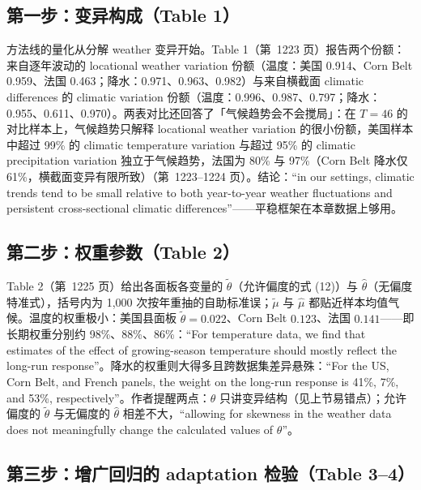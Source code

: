 \subsection{第一步：变异构成（Table 1）}

方法线的量化从分解 weather 变异开始。Table 1（第~1223 页）报告两个份额：来自逐年波动的 locational weather variation 份额（温度：美国 0.914、Corn Belt 0.959、法国 0.463；降水：0.971、0.963、0.982）与来自横截面 climatic differences 的 climatic variation 份额（温度：0.996、0.987、0.797；降水：0.955、0.611、0.970）。两表对比还回答了「气候趋势会不会搅局」：在 $T=46$ 的对比样本上，气候趋势只解释 locational weather variation 的很小份额，美国样本中超过 99\% 的 climatic temperature variation 与超过 95\% 的 climatic precipitation variation 独立于气候趋势，法国为 80\% 与 97\%（Corn Belt 降水仅 61\%，横截面变异有限所致）（第~1223--1224 页）。结论：``in our settings, climatic trends tend to be small relative to both year-to-year weather fluctuations and persistent cross-sectional climatic differences''\citep[第~1224 页]{merel2021climate}——平稳框架在本章数据上够用。

\subsection{第二步：权重参数（Table 2）}

Table 2（第~1225 页）给出各面板各变量的 $\widetilde{\theta}$（允许偏度的式 (12)）与 $\widehat{\theta}$（无偏度特准式），括号内为 1{,}000 次按年重抽的自助标准误；$\widetilde{\mu}$ 与 $\widehat{\mu}$ 都贴近样本均值气候。温度的权重极小：美国县面板 $\widetilde{\theta}=0.022$、Corn Belt $0.123$、法国 $0.141$——即长期权重分别约 98\%、88\%、86\%：``For temperature data, we find that estimates of the effect of growing-season temperature should mostly reflect the long-run response''\citep[第~1225 页]{merel2021climate}。降水的权重则大得多且跨数据集差异悬殊：``For the US, Corn Belt, and French panels, the weight on the long-run response is 41\%, 7\%, and 53\%, respectively''\citep[第~1225 页]{merel2021climate}。作者提醒两点：$\theta$ 只讲变异结构（见上节易错点）；允许偏度的 $\widetilde{\theta}$ 与无偏度的 $\widehat{\theta}$ 相差不大，``allowing for skewness in the weather data does not meaningfully change the calculated values of $\theta$''\citep[第~1225 页]{merel2021climate}。

\subsection{第三步：增广回归的 adaptation 检验（Table 3--4）}

